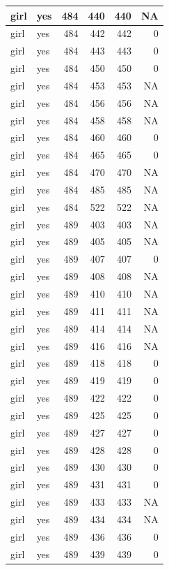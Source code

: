 \documentclass[man]{apa6}
\begin{document}
\begin{tabular}{l|l|r|r|r|r}
\hline
girl & yes & 484 & 440 & 440 & NA\\
\hline
girl & yes & 484 & 442 & 442 & 0\\
\hline
girl & yes & 484 & 443 & 443 & 0\\
\hline
girl & yes & 484 & 450 & 450 & 0\\
\hline
girl & yes & 484 & 453 & 453 & NA\\
\hline
girl & yes & 484 & 456 & 456 & NA\\
\hline
girl & yes & 484 & 458 & 458 & NA\\
\hline
girl & yes & 484 & 460 & 460 & 0\\
\hline
girl & yes & 484 & 465 & 465 & 0\\
\hline
girl & yes & 484 & 470 & 470 & NA\\
\hline
girl & yes & 484 & 485 & 485 & NA\\
\hline
girl & yes & 484 & 522 & 522 & NA\\
\hline
girl & yes & 489 & 403 & 403 & NA\\
\hline
girl & yes & 489 & 405 & 405 & NA\\
\hline
girl & yes & 489 & 407 & 407 & 0\\
\hline
girl & yes & 489 & 408 & 408 & NA\\
\hline
girl & yes & 489 & 410 & 410 & NA\\
\hline
girl & yes & 489 & 411 & 411 & NA\\
\hline
girl & yes & 489 & 414 & 414 & NA\\
\hline
girl & yes & 489 & 416 & 416 & NA\\
\hline
girl & yes & 489 & 418 & 418 & 0\\
\hline
girl & yes & 489 & 419 & 419 & 0\\
\hline
girl & yes & 489 & 422 & 422 & 0\\
\hline
girl & yes & 489 & 425 & 425 & 0\\
\hline
girl & yes & 489 & 427 & 427 & 0\\
\hline
girl & yes & 489 & 428 & 428 & 0\\
\hline
girl & yes & 489 & 430 & 430 & 0\\
\hline
girl & yes & 489 & 431 & 431 & 0\\
\hline
girl & yes & 489 & 433 & 433 & NA\\
\hline
girl & yes & 489 & 434 & 434 & NA\\
\hline
girl & yes & 489 & 436 & 436 & 0\\
\hline
girl & yes & 489 & 439 & 439 & 0\\

\end{tabular}
\end{document}
